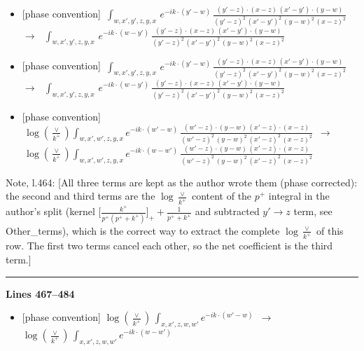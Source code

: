 \documentclass[10pt]{article}
\newenvironment{notebox}{\def\FrameCommand{{\color{notebar}\vrule width 1.5pt}\hspace{6pt}}\MakeFramed{\advance\hsize-\width\FrameRestore}\small}{\endMakeFramed}
\begin{document}
\begin{itemize}[leftmargin=2.2em,itemsep=1pt,topsep=2pt]
\item[\textbf{l.460}] \textsf{\small [phase convention]} $\displaystyle \, \int_{w,x',y',z,y,x}\, e^{-ik\cdot (y'-w)}\,\frac{(y'-z)\cdot (x-z)\,(x'-y')\cdot (y-w)}{(y'-z)^{2}\,(x'-y')^{2}\,(y-w)^{2}\,(x-z)^{2}}$\ $\longrightarrow$\ $\displaystyle \, \int_{w,x',y',z,y,x}\, e^{-ik\cdot (w-y')}\,\frac{(y'-z)\cdot (x-z)\,(x'-y')\cdot (y-w)}{(y'-z)^{2}\,(x'-y')^{2}\,(y-w)^{2}\,(x-z)^{2}}$
\item[\textbf{l.461}] \textsf{\small [phase convention]} $\displaystyle \, \int_{w,x',y',z,y,x}\, e^{-ik\cdot (y'-w)}\,\frac{(y'-z)\cdot (x-z)\,(x'-y')\cdot (y-w)}{(y'-z)^{2}\,(x'-y')^{2}\,(y-w)^{2}\,(x-z)^{2}}$\ $\longrightarrow$\ $\displaystyle \, \int_{w,x',y',z,y,x}\, e^{-ik\cdot (w-y')}\,\frac{(y'-z)\cdot (x-z)\,(x'-y')\cdot (y-w)}{(y'-z)^{2}\,(x'-y')^{2}\,(y-w)^{2}\,(x-z)^{2}}$
\item[\textbf{l.462}] \textsf{\small [phase convention]} $\displaystyle \,\log{(\frac{\vee}{k^{+}})}\int_{w,x',w',z,y,x} e^{-ik\cdot (w'-w)}\,\frac{(w'-z)\cdot (y-w)\,(x'-z)\cdot (x-z)}{(w'-z)^{2}\,(y-w)^{2}\,(x'-z)^{2}\,(x-z)^{2}}$\ $\longrightarrow$\ $\displaystyle \,\log{(\frac{\vee}{k^{+}})}\int_{w,x',w',z,y,x} e^{-ik\cdot (w-w')}\,\frac{(w'-z)\cdot (y-w)\,(x'-z)\cdot (x-z)}{(w'-z)^{2}\,(y-w)^{2}\,(x'-z)^{2}\,(x-z)^{2}}$
\end{itemize}
\begin{notebox}\textsf{\small Note, l.464:} [All three terms are kept as the author wrote them (phase corrected): the second and third terms are the $\log\frac{\vee}{k^{+}}$ content of the $p^{+}$ integral in the author's split (kernel $\big[\frac{k^{+}}{p^{+}(p^{+}+k^{+})}\big]_{+}+\frac{1}{p^{+}+k^{+}}$ and subtracted $y'\to z$ term, see Other\_terms), which is the correct way to extract the complete $\log\frac{\vee}{k^{+}}$ of this row. The first two terms cancel each other, so the net coefficient is the third term.]\end{notebox}
\noindent\rule{\linewidth}{0.3pt}\par\noindent\textbf{Lines 467--484} \par
\begin{itemize}[leftmargin=2.2em,itemsep=1pt,topsep=2pt]
\item[\textbf{l.467}] \textsf{\small [phase convention]} $\displaystyle \log{(\frac{\vee}{k^{+}})}\, \int_{x,x',z,w,w'}e^{-ik\cdot(w'-w)}$\ $\longrightarrow$\ $\displaystyle \log{(\frac{\vee}{k^{+}})}\, \int_{x,x',z,w,w'}e^{-ik\cdot(w-w')}$
\end{itemize}
\end{document}
